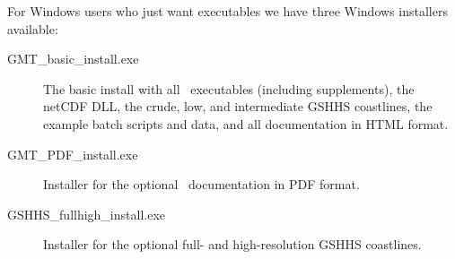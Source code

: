 For Windows users who just want executables we have three Windows installers available:

\begin{description}

\item[GMT\_basic\_install.exe] The basic install with all \GMT\ executables (including supplements),
the netCDF DLL, the crude, low, and intermediate GSHHS coastlines, the example batch scripts and data, and all
documentation in HTML format.

\item[GMT\_PDF\_install.exe] Installer for the optional \GMT\ documentation in PDF format.

\item[GSHHS\_fullhigh\_install.exe] Installer for the optional full- and high-resolution GSHHS coastlines.

\end{description}

